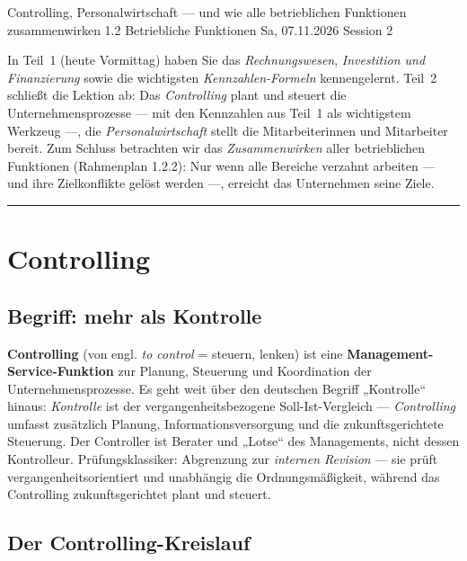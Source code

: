 \documentclass[11pt, a4paper]{article}
\begin{document}
%
  {Controlling, Personalwirtschaft --- und wie alle betrieblichen Funktionen zusammenwirken}%
  {1.2 Betriebliche Funktionen}%
  {Sa, 07.11.2026 \textperiodcentered{} Session 2}

\begin{merksatz}[title={\bfseries Worum geht es in dieser Session?}]
In Teil~1 (heute Vormittag) haben Sie das \emph{Rechnungswesen}, \emph{Investition und
Finanzierung} sowie die wichtigsten \emph{Kennzahlen-Formeln} kennengelernt. Teil~2
schließt die Lektion ab: Das \emph{Controlling} plant und steuert die
Unternehmensprozesse --- mit den Kennzahlen aus Teil~1 als wichtigstem Werkzeug ---, die
\emph{Personalwirtschaft} stellt die Mitarbeiterinnen und Mitarbeiter bereit. Zum Schluss
betrachten wir das \emph{Zusammenwirken} aller betrieblichen Funktionen (Rahmenplan
1.2.2): Nur wenn alle Bereiche verzahnt arbeiten --- und ihre Zielkonflikte gelöst
werden ---, erreicht das Unternehmen seine Ziele.
\end{merksatz}

\tableofcontents
\vspace{1em}
\hrule
\vspace{1em}

\section{Controlling}

\subsection{Begriff: mehr als Kontrolle}

\textbf{Controlling} (von engl. \emph{to control} = steuern, lenken) ist eine
\textbf{Management-Service-Funktion} zur Planung, Steuerung und Koordination der
Unternehmensprozesse. Es geht weit über den deutschen Begriff „Kontrolle`` hinaus:
\emph{Kontrolle} ist der vergangenheitsbezogene Soll-Ist-Vergleich --- \emph{Controlling}
umfasst zusätzlich Planung, Informationsversorgung und die zukunftsgerichtete Steuerung.
Der Controller ist Berater und „Lotse`` des Managements, nicht dessen Kontrolleur.
Prüfungsklassiker: Abgrenzung zur \emph{internen Revision} --- sie prüft
vergangenheitsorientiert und unabhängig die Ordnungsmäßigkeit, während das Controlling
zukunftsgerichtet plant und steuert.

\subsection{Der Controlling-Kreislauf}
\end{document}
